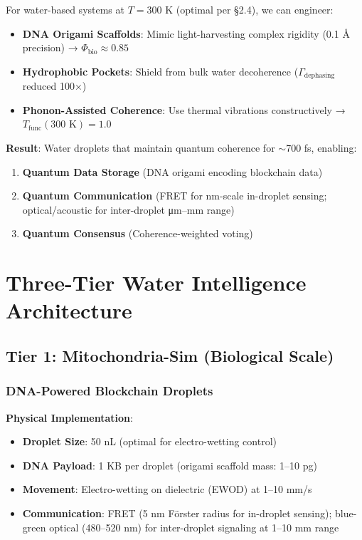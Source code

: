\documentclass[12pt]{article}
\begin{document}
For water-based systems at $T = 300$ K (optimal per §2.4), we can engineer:
\begin{itemize}
\item \textbf{DNA Origami Scaffolds}: Mimic light-harvesting complex rigidity (0.1 Å precision) → $\Phi_{\text{bio}} \approx 0.85$
\item \textbf{Hydrophobic Pockets}: Shield from bulk water decoherence ($\Gamma_{\text{dephasing}}$ reduced 100×)
\item \textbf{Phonon-Assisted Coherence}: Use thermal vibrations constructively → $T_{\text{func}}(300\text{ K}) = 1.0$
\end{itemize}

\textbf{Result}: Water droplets that maintain quantum coherence for $\sim$700 fs, enabling:
\begin{enumerate}
\item \textbf{Quantum Data Storage} (DNA origami encoding blockchain data)
\item \textbf{Quantum Communication} (FRET for nm-scale in-droplet sensing; optical/acoustic for inter-droplet μm--mm range)
\item \textbf{Quantum Consensus} (Coherence-weighted voting)
\end{enumerate}

\section{Three-Tier Water Intelligence Architecture}

\subsection{Tier 1: Mitochondria-Sim (Biological Scale)}

\subsubsection{DNA-Powered Blockchain Droplets}

\textbf{Physical Implementation}:
\begin{itemize}
\item \textbf{Droplet Size}: 50 nL (optimal for electro-wetting control)
\item \textbf{DNA Payload}: 1 KB per droplet (origami scaffold mass: 1--10 pg)
\item \textbf{Movement}: Electro-wetting on dielectric (EWOD) at 1--10 mm/s
\item \textbf{Communication}: FRET (5 nm Förster radius for in-droplet sensing); blue-green optical (480--520 nm) for inter-droplet signaling at 1--10 mm range
\end{itemize}
\end{document}
